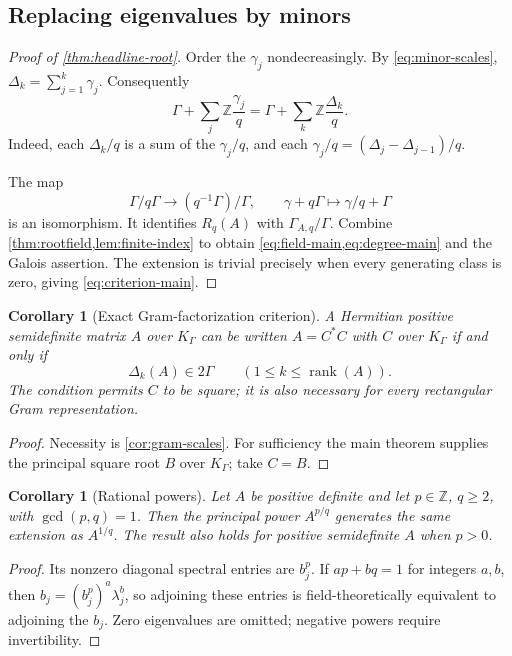 \documentclass[11pt,letterpaper]{article}
\numberwithin{equation}{section}
\newtheorem{corollary}[theorem]{Corollary}
\theoremstyle{definition}
\theoremstyle{remark}
\newcommand{\Z}{\mathbb Z}
\newcommand{\rank}{\operatorname{rank}}
\newcommand{\KG}{K_{\Gamma}}
\begin{document}
\subsection{Replacing eigenvalues by minors}

\begin{proof}[Proof of \cref{thm:headline-root}]
Order the $\gamma_j$ nondecreasingly. By \cref{eq:minor-scales},
$\Delta_k=\sum_{j=1}^k\gamma_j$. Consequently
\begin{equation}\label{eq:same-lattice}
 \Gamma+\sum_j\Z\frac{\gamma_j}q
 =\Gamma+\sum_k\Z\frac{\Delta_k}q.
\end{equation}
Indeed, each $\Delta_k/q$ is a sum of the $\gamma_j/q$, and each
$\gamma_j/q=(\Delta_j-\Delta_{j-1})/q$.

The map
\[
 \Gamma/q\Gamma\longrightarrow (q^{-1}\Gamma)/\Gamma,
 \qquad \gamma+q\Gamma\longmapsto\gamma/q+\Gamma
\]
is an isomorphism. It identifies $R_q(A)$ with
$\Gamma_{A,q}/\Gamma$. Combine \cref{thm:rootfield,lem:finite-index} to obtain
\cref{eq:field-main,eq:degree-main} and the Galois assertion. The extension
is trivial precisely when every generating class is zero, giving
\cref{eq:criterion-main}.
\end{proof}

\begin{corollary}[Exact Gram-factorization criterion]\label{cor:gram-criterion}
A Hermitian positive semidefinite matrix $A$ over $\KG$ can be written
$A=C^*C$ with $C$ over $\KG$ if and only if
\[
 \Delta_k(A)\in2\Gamma\qquad(1\le k\le\rank(A)).
\]
The condition permits $C$ to be square; it is also necessary for every
rectangular Gram representation.
\end{corollary}
\begin{proof}
Necessity is \cref{cor:gram-scales}. For sufficiency the main theorem supplies
the principal square root $B$ over $\KG$; take $C=B$.
\end{proof}

\begin{corollary}[Rational powers]\label{cor:rationalpower}
Let $A$ be positive definite and let $p\in\Z$, $q\ge2$, with
$\gcd(p,q)=1$. Then the principal power $A^{p/q}$ generates the same extension
as $A^{1/q}$. The result also holds for positive semidefinite $A$ when $p>0$.
\end{corollary}
\begin{proof}
Its nonzero diagonal spectral entries are $b_j^p$. If $ap+bq=1$ for integers
$a,b$, then $b_j=(b_j^p)^a\lambda_j^b$, so adjoining these entries is
field-theoretically equivalent to adjoining the $b_j$. Zero eigenvalues
are omitted; negative powers require invertibility.
\end{proof}
\end{document}
